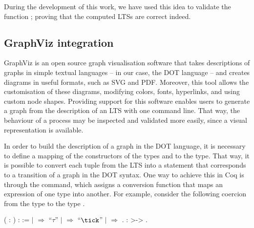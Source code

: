 During the development of this work, we have used this idea to validate the function ; proving that the computed LTSs are correct indeed.

\subsection{GraphViz integration}

GraphViz is an open source graph visualisation software that takes descriptions of graphs in simple textual languages -- in our case, the DOT language -- and creates diagrams in useful formats, such as SVG and PDF. Moreover, this tool allows the customisation of these diagrams, modifying colors, fonts, hyperlinks, and using custom node shapes. Providing support for this software enables \CSPcoq{} users to generate a graph from the description of an LTS with one command line. That way, the behaviour of a process may be inspected and validated more easily, since a visual representation is available.

In order to build the description of a graph in the DOT language, it is necessary to define a mapping of the constructors of the types  and  to the  type. That way, it is possible to convert each tuple from the LTS into a statement that corresponds to a transition of a graph in the DOT syntax. One way to achieve this in Coq is through the  command, which assigns a conversion function that maps an expression of one type into another. For example, consider the following coercion from the type  to the type .

\begin{coqdoccode}
	\coqdocnoindent
	  ( : ) :  :=\coqdoceol
	\coqdocindent{1.00em}
	  \coqdoceol
	\coqdocindent{1.00em}
	\ensuremath{|}  \ensuremath{\Rightarrow} ``$ \tau $''\coqdoceol
	\coqdocindent{1.00em}
	\ensuremath{|}  \ensuremath{\Rightarrow} ``$ \tick $''\coqdoceol
	\coqdocindent{1.00em}
	\ensuremath{|}   \ensuremath{\Rightarrow} \coqdoceol
	\coqdocindent{1.00em}
	.\coqdoceol
	\coqdocemptyline
	\coqdocnoindent
	  :  >-> .\coqdoceol
\end{coqdoccode}

